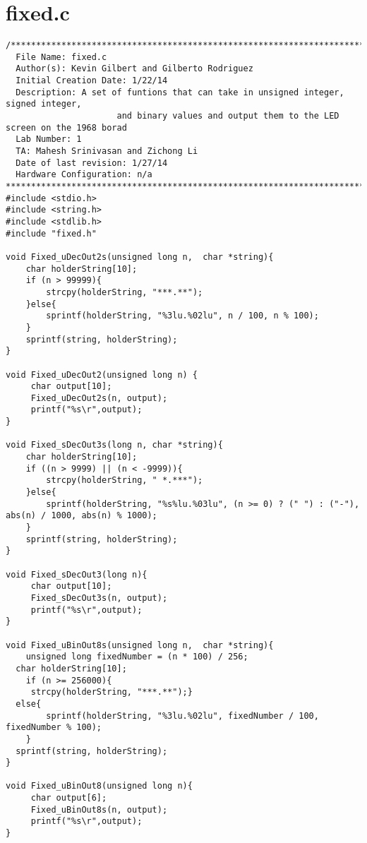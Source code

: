 \documentclass[11pt]{article}
\begin{document}
\section*{fixed.c}
\begin{verbatim}
/************************************************************************
  File Name: fixed.c
  Author(s): Kevin Gilbert and Gilberto Rodriguez
  Initial Creation Date: 1/22/14
  Description: A set of funtions that can take in unsigned integer, signed integer, 
	                  and binary values and output them to the LED screen on the 1968 borad
  Lab Number: 1
  TA: Mahesh Srinivasan and Zichong Li
  Date of last revision: 1/27/14
  Hardware Configuration: n/a
*************************************************************************/
#include <stdio.h>
#include <string.h>
#include <stdlib.h>
#include "fixed.h"

void Fixed_uDecOut2s(unsigned long n,  char *string){
	char holderString[10];
	if (n > 99999){
		strcpy(holderString, "***.**");
	}else{
		sprintf(holderString, "%3lu.%02lu", n / 100, n % 100);
	}
	sprintf(string, holderString);
}

void Fixed_uDecOut2(unsigned long n) {
	 char output[10];
	 Fixed_uDecOut2s(n, output);
	 printf("%s\r",output);
}

void Fixed_sDecOut3s(long n, char *string){
	char holderString[10];
	if ((n > 9999) || (n < -9999)){
		strcpy(holderString, " *.***");
	}else{
		sprintf(holderString, "%s%lu.%03lu", (n >= 0) ? (" ") : ("-"), abs(n) / 1000, abs(n) % 1000);
	}
	sprintf(string, holderString);
}

void Fixed_sDecOut3(long n){
	 char output[10];
	 Fixed_sDecOut3s(n, output);
	 printf("%s\r",output);
}

void Fixed_uBinOut8s(unsigned long n,  char *string){
	unsigned long fixedNumber = (n * 100) / 256;
  char holderString[10];
	if (n >= 256000){
	 strcpy(holderString, "***.**");}
  else{								  	
		sprintf(holderString, "%3lu.%02lu", fixedNumber / 100, fixedNumber % 100);
	}
  sprintf(string, holderString);
}

void Fixed_uBinOut8(unsigned long n){
	 char output[6];
	 Fixed_uBinOut8s(n, output);
	 printf("%s\r",output);
}
\end{verbatim}
\end{document}
